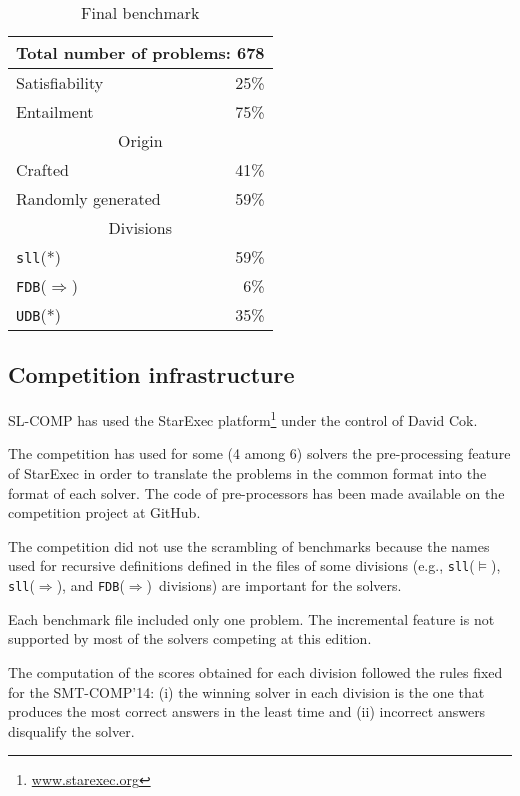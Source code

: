 \documentclass{llncs}
\newcommand{\limp}{\Rightarrow}
\newcommand{\sllsat}{\texttt{sll}($\models$)}
\newcommand{\sllent}{\texttt{sll}($\limp$)}
\newcommand{\FDBent}{\texttt{FDB}($\limp$)}
\begin{document}
\begin{table}
\begin{center}
\begin{tabular}{p{7cm}r}\hline
\multicolumn{2}{c}{Total number of problems: 678} \\
\hline
Satisfiability & 25\% \\
Entailment & 75\% \\
\hline
%
\hline
\multicolumn{2}{c}{Origin} \\
\hline
Crafted & 41\% \\
Randomly generated & 59\% \\
\hline
%
\hline
\multicolumn{2}{c}{Divisions} \\
\hline
\texttt{sll}(*) & 59\% \\
\FDBent & 6\% \\
\texttt{UDB}(*) & 35\% \\
\hline
\end{tabular}
\end{center}
\caption{Final benchmark}
\label{tab:bench}
\end{table}




\subsection{Competition infrastructure}

SL-COMP has used the StarExec platform\footnote{\url{www.starexec.org}} under the control of David Cok. 

The competition has used for some (4 among 6) solvers  the pre-processing feature of StarExec in order to translate the problems in the common format into the format of each solver. The code of pre-processors has been made available on the competition project at GitHub.

The competition did not use the scrambling of benchmarks because the names used for recursive definitions defined in the files of some divisions (e.g., \sllsat, \sllent, and \FDBent\ divisions) are important for the solvers.

Each benchmark file included only one problem. 
The incremental feature is not supported by most of the solvers competing at this edition.

The computation of the scores obtained for each division followed the rules fixed for the SMT-COMP'14: 
(i) the winning solver in each division is the one that produces the most correct answers in the least time and
(ii) incorrect answers disqualify the solver.
\end{document}
